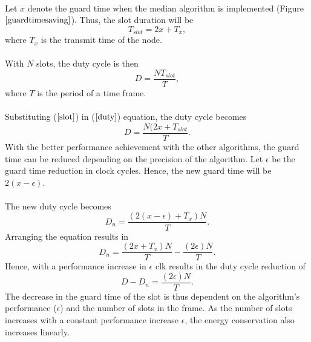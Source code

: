 \documentclass[a4paper,10pt]{report}
\begin{document}
\paragraph*{}
Let $x$ denote the guard time when the median algorithm is implemented (Figure $\ref{guardtimesaving}$). Thus, the slot
duration will be
\begin{equation}
T_{slot}=2x + T_x ,
\label{slot}
\end{equation}
where $T_x$ is the transmit time of the node.
\paragraph*{}
With $N$ slots, the duty cycle is then
\begin{equation}
D = \frac{NT_{slot}}{T}, \label{duty}
\end{equation}
where $T$ is the period of a time frame. \paragraph*{} Substituting ($\ref{slot}$) in ($\ref{duty}$) equation, the duty cycle becomes
\begin{equation}
D= \frac{N(2x+T_{slot}}{T}.
\end{equation}
With the better performance achievement with the other algorithms, the guard time can be reduced depending on the precision of the
algorithm. Let $\epsilon$ be the guard time reduction in clock cycles. Hence, the new guard time will be $2(x-\epsilon)$.
\paragraph*{} The new duty cycle becomes
\begin{equation}
D_n=\frac{(2(x-\epsilon)+T_x)N}{T}.
\end{equation}
Arranging the equation results in
\begin{equation}
D_n= \frac{(2x+T_x)N}{T} - \frac{(2\epsilon)N}{T}.
\end{equation}
Hence, with a performance increase in $\epsilon$ clk results in the duty cycle reduction of
\begin{equation}
D - D_n = \frac{(2\epsilon)N}{T}.
\end{equation}
The decrease in the guard time of the slot is thus dependent on the algorithm's performance ($\epsilon$) and the number of slots in the
frame. As the number of slots increases with a constant performance increase $\epsilon$, the energy conservation also increases linearly.
\end{document}

